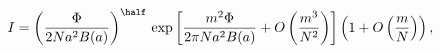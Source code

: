 \begin{equation}
\label{Eq_A49}
I = \left( \frac{\Phi}{2 N a^2 B(a)} \right)^{\half} \, \text{exp}
  \left[
  \frac{m^2 \Phi}{2\pi N a^2 B(a)} + O\left(\frac{m^3}{N^2}\right)
  \right]
  \left( 1 + O\left(\frac{m}{N}\right) \right),
\end{equation}

